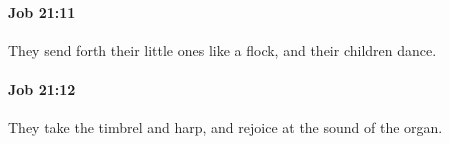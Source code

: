 		\paragraph{Job 21:11} %
			\label{JOB-21-11}

			They send forth their little ones like a flock, and their children dance.


		\paragraph{Job 21:12} %
			\label{JOB-21-12}

			They take the timbrel and harp, and rejoice at the sound of the organ.


